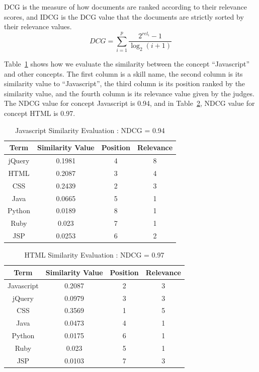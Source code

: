 DCG is the measure of how documents are ranked according to their relevance scores, and IDCG is the DCG value that the documents are strictly sorted by their relevance values.
$$DCG =  \sum_{i=1}^{p} \frac {2^{rel_i} - 1}{\log_2(i+1)} $$

Table~\ref{tab:simcompare1} shows how we evaluate the similarity between the concept ``Javascript'' and other concepts. The first column is a skill name, the second column is its similarity value to ``Javascript'', the third column is its position ranked by the similarity value, and the fourth column is its relevance value given by the judges. The NDCG value for concept Javascript is 0.94, and in Table~\ref{tab:simcompare2},  NDCG value for concept HTML is 0.97.

\begin{table}
\centering
\caption{ Javascript Similarity Evaluation : NDCG = 0.94 }
\begin{tabular}{ | c | c | c  | c |  }
 \hline
    Term     &  Similarity Value  &  Position   & Relevance     \\  \hline
    jQuery   &  0.1981            &      4      &   8        \\
     HTML    &  0.2087            &      3      &   4         \\
     CSS     &  0.2439            &      2      &   3   \\
     Java    &  0.0665            &      5      &   1   \\
    Python   &  0.0189            &      8      &   1   \\
     Ruby    &  0.023             &      7      &   1    \\
     JSP     &  0.0253            &      6      &   2    \\
 \hline
\end{tabular}
\label{tab:simcompare1}
\end{table}


\begin{table}
\centering
\caption{ HTML Similarity Evaluation : NDCG = 0.97 }
\begin{tabular}{ | c | c | c  | c |  }
 \hline
    Term      &  Similarity Value  &  Position   & Relevance     \\  \hline
  Javascript   &  0.2087           &      2      &   3        \\
     jQuery    &  0.0979           &      3      &   3         \\
     CSS     &  0.3569             &      1      &   5   \\
     Java    &  0.0473             &      4      &   1   \\
    Python   &  0.0175             &      6      &   1   \\
     Ruby    &  0.023              &      5      &   1    \\
     JSP     &  0.0103             &      7      &   3    \\
 \hline
\end{tabular}
\label{tab:simcompare2}
\end{table}

